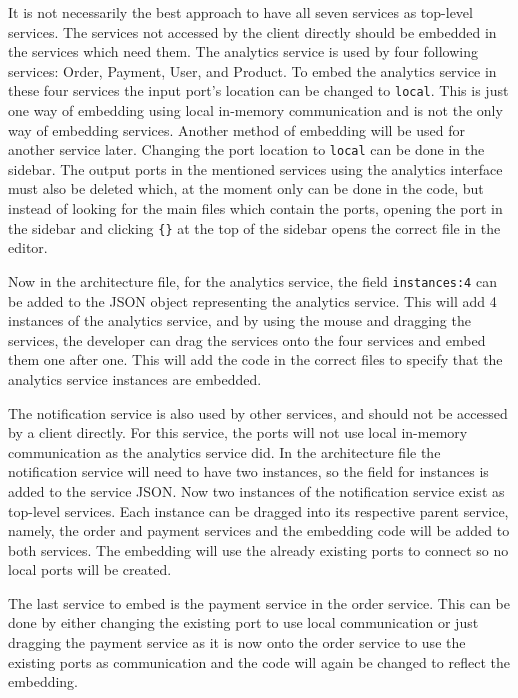 It is not necessarily the best approach to have all seven services as top-level services. The services not accessed by the client directly should be embedded in the services which need them.
The analytics service is used by four following services: Order, Payment, User, and Product. To embed the analytics service in these four services the input port's location can be changed to \texttt{local}. This is just one way of embedding using local in-memory communication and is not the only way of embedding services. Another method of embedding will be used for another service later.
Changing the port location to \texttt{local} can be done in the sidebar.
The output ports in the mentioned services using the analytics interface must also be deleted which, at the moment only can be done in the code, but instead of looking for the main files which contain the ports,
opening the port in the sidebar and clicking \texttt{\{\}} at the top of the sidebar opens the correct file in the editor.

Now in the architecture file, for the analytics service, the field \texttt{instances:4} can be added to the JSON object representing the analytics service. This will add 4 instances of the analytics service, and by using the mouse and dragging the services, the developer can 
drag the services onto the four services and embed them one after one. This will add the code in the correct files to specify that the analytics service instances are embedded.

The notification service is also used by other services, and should not be accessed by a client directly. For this service, the ports will not use local in-memory communication as the analytics service did.
In the architecture file the notification service will need to have two instances, so the field for instances is added to the service JSON. Now two instances of the notification service exist as top-level services. Each instance can be dragged into its respective
parent service, namely, the order and payment services and the embedding code will be added to both services. The embedding will use the already existing ports to connect so no local ports will be created.

The last service to embed is the payment service in the order service. This can be done by either changing the existing port to use local communication or just dragging the payment service
as it is now onto the order service to use the existing ports as communication and the code will again be changed to reflect the embedding.

